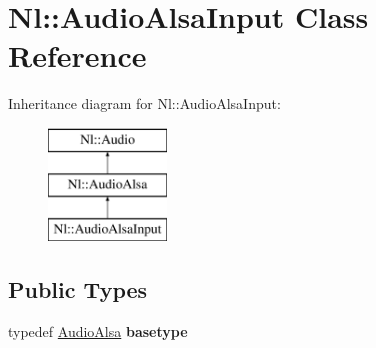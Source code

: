 \hypertarget{classNl_1_1AudioAlsaInput}{\section{Nl\-:\-:Audio\-Alsa\-Input Class Reference}
\label{classNl_1_1AudioAlsaInput}
}
Inheritance diagram for Nl\-:\-:Audio\-Alsa\-Input\-:\begin{figure}[H]
\begin{center}
\leavevmode
\includegraphics[height=3.000000cm]{classNl_1_1AudioAlsaInput}
\end{center}
\end{figure}
\subsection*{Public Types}
\begin{DoxyCompactItemize}
\item 
\hypertarget{classNl_1_1AudioAlsaInput_ac39e7e54c4aaaaa5c294c95cda6e3d87}{typedef \hyperlink{classNl_1_1AudioAlsa}{Audio\-Alsa} {\bfseries basetype}}\label{classNl_1_1AudioAlsaInput_ac39e7e54c4aaaaa5c294c95cda6e3d87}

\end{DoxyCompactItemize}
